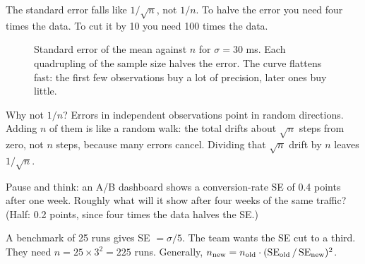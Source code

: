 The standard error falls like $1/\sqrt n$, not $1/n$. To halve the error you need
four times the data. To cut it by 10 you need 100 times the data.

\begin{figure}[H]
\centering
{}
\caption{Standard error of the mean against $n$ for $\sigma=30$ ms. Each
quadrupling of the sample size halves the error. The curve flattens fast:
the first few observations buy a lot of precision, later ones buy little.}
\label{fig:sd-sqrtn}
\end{figure}

\begin{intuitionbox}
Why not $1/n$? Errors in independent observations point in random directions.
Adding $n$ of them is like a random walk: the total drifts about $\sqrt n$ steps
from zero, not $n$ steps, because many errors cancel. Dividing that $\sqrt n$
drift by $n$ leaves $1/\sqrt n$.
\end{intuitionbox}

\begin{recoverybox}
Pause and think: an A/B dashboard shows a conversion-rate SE of 0.4 points after
one week. Roughly what will it show after four weeks of the same traffic?
(Half: 0.2 points, since four times the data halves the SE.)
\end{recoverybox}

\begin{example}
A benchmark of 25 runs gives SE $=\sigma/5$. The team wants the SE cut to a third.
They need $n=25\times 3^2=225$ runs. Generally, $n_{\text{new}}=n_{\text{old}}\cdot
(\operatorname{SE}_{\text{old}}/\operatorname{SE}_{\text{new}})^2$.
\end{example}

